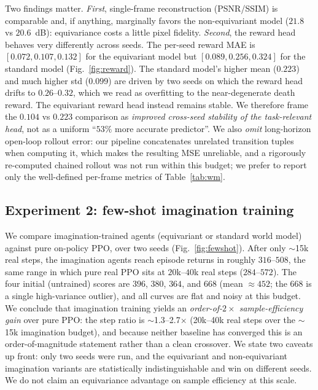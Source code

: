 \documentclass[sigconf,anonymous]{acmart}
\begin{document}
Two findings matter. \emph{First}, single-frame reconstruction (PSNR/SSIM)
is comparable and, if anything, marginally favors the non-equivariant model
($21.8$ vs $20.6$~dB): equivariance costs a little pixel fidelity.
\emph{Second}, the reward head behaves very differently across seeds. The
per-seed reward MAE is $[0.072,0.107,0.132]$ for the equivariant model but
$[0.089,0.256,0.324]$ for the standard model (Fig.~\ref{fig:reward}). The
standard model's higher mean ($0.223$) and much higher std ($0.099$) are
driven by two seeds on which the reward head drifts to $0.26$--$0.32$, which
we read as overfitting to the near-degenerate death reward. The equivariant
reward head instead remains stable. We therefore frame the $0.104$ vs
$0.223$ comparison as \emph{improved cross-seed stability of the task-relevant
head}, not as a uniform ``$53\%$ more accurate predictor''. We also
\emph{omit} long-horizon open-loop rollout error: our pipeline concatenates
unrelated transition tuples when computing it, which makes the resulting MSE
unreliable, and a rigorously re-computed chained rollout was not run within
this budget; we prefer to report only the well-defined per-frame metrics of
Table~\ref{tab:wm}.

\subsection{Experiment 2: few-shot imagination training}
We compare imagination-trained agents (equivariant or standard world model)
against pure on-policy PPO, over two seeds
(Fig.~\ref{fig:fewshot}). After only $\sim$15k real steps, the imagination
agents reach episode returns in roughly $316$--$508$, the same range in which
pure real PPO sits at $20$k--$40$k real steps ($284$--$572$). The four
initial (untrained) scores are $396$, $380$, $364$, and $668$ (mean $\approx452$;
the $668$ is a single high-variance outlier), and all curves are flat and
noisy at this budget. We conclude that imagination training yields an
\emph{order-of-$2\times$ sample-efficiency gain} over pure PPO: the step
ratio is $\sim$1.3--2.7$\times$ (20k--40k real steps over the $\sim$15k
imagination budget), and because neither baseline has converged this is an
order-of-magnitude statement rather than a clean crossover. We state two
caveats up front: only two seeds were run, and the equivariant and
non-equivariant imagination variants are statistically indistinguishable and
win on different seeds. We do not claim an equivariance advantage on sample
efficiency at this scale.
\end{document}
